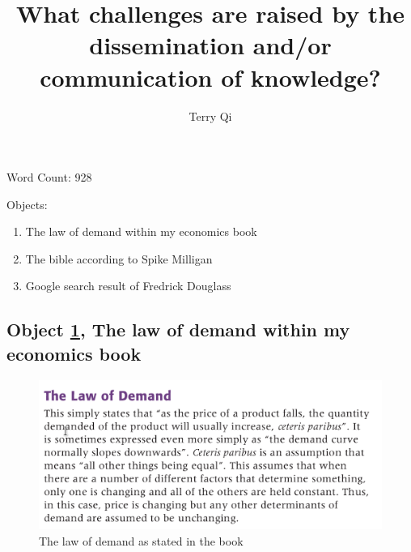 \documentclass[a4paper,11pt]{article}
\title{What challenges are raised by the dissemination and/or communication of knowledge?}
\author{Terry Qi}
\begin{document}
\maketitle

Word Count: 928

Objects:
\begin{enumerate}
 \item The law of demand within my economics book
 \item The bible according to Spike Milligan
 \item Google search result of Fredrick Douglass
\end{enumerate}

\newpage




\subsection*{Object \ref{fig:lod}, The law of demand within my economics book}

\begin{figure}[H]
 \centering
 \includegraphics[scale=0.3]{ecobook.png}
 \caption{The law of demand as stated in the book}
 \label{fig:lod}
\end{figure}
\end{document}
